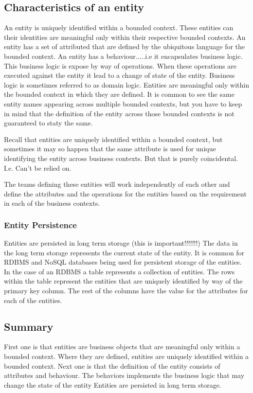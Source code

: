 \documentclass[a4paper, 11pt]{book}
\begin{document}
    \subsection{Characteristics of an entity}
    An entity is uniquely identified within a bounded context.
    These entities can their identities are meaningful only within their respective bounded contexts.
    An entity has a set of attributed that are defined by the ubiquitous language for the bounded context.
    An entity has a behaviour.....i.e it encapsulates business logic.
    This business logic is expose by way of operations.
    When these operations are executed against the entity it lead to a change of state of the entity.
    Business logic is sometimes referred to as domain logic.
    Entities are meaningful only within the bounded context in which they are defined.
    It is common to see the same entity names appearing across multiple bounded contexts,
    but you have to keep in mind that the definition of the entity across those bounded contexts is not guaranteed to staty the same.

    Recall that entities are uniquely identified within a bounded context, but sometimes it may so happen that the same attribute is used for unique identifying the entity across business contexts.
    But that is purely coincidental.
    I.e. Can't be relied on.

    The teams defining these entities will work independently of each other and define the attributes and the operations for the entities based on the requirement in each of the business contexts.
    \subsubsection{Entity Persistence}
    Entities are persisted in long term storage (this is important!!!!!!!)
    The data in the long term storage represents the current state of the entity.
    It is common for RDBMS and NoSQL databases being used for persistent storage of the entities.
    In the case of an RDBMS a table represents a collection of entities.
    The rows within the table represent the entities that are uniquely identified by way of the primary key column.
    The rest of the columns have the value for the attributes for each of the entities.

    \subsection{Summary}
    First one is that entities are business objects that are meaningful only within a bounded context.
    Where they are defined, entities are uniquely identified within a bounded context.
    Next one is that the definition of the entity consists of attributes and behaviour.
    The behaviors implements the business logic that may change the state of the entity
    Entities are persisted in long term storage.
\end{document}
